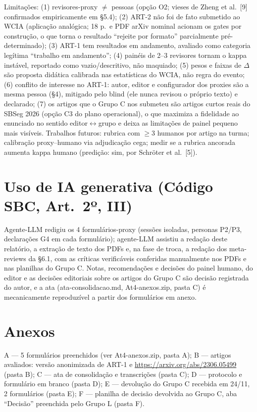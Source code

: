 \documentclass[10pt,a4paper,twocolumn]{article}
\begin{document}
Limitações: (1) revisores-proxy $\neq$ pessoas (opção O2; vieses de Zheng et al.\ [9] confirmados empiricamente em \S5.4); (2) ART-2 não foi de fato submetido ao WCIA (aplicação analógica; 18 p.\ e PDF arXiv nominal acionam os gates por construção, o que torna o resultado ``rejeite por formato'' parcialmente pré-determinado); (3) ART-1 tem resultados em andamento, avaliado como categoria legítima ``trabalho em andamento''; (4) painéis de 2--3 revisores tornam o kappa instável, reportado como vazio/descritivo, não maquiado; (5) pesos e faixas de $\Delta$ são proposta didática calibrada nas estatísticas do WCIA, não regra do evento; (6) conflito de interesse no ART-1: autor, editor e configurador dos proxies são a mesma pessoa (\S4), mitigado pelo blind (ele nunca revisou o próprio texto) e declarado; (7) os artigos que o Grupo C nos submeteu são artigos curtos reais do SBSeg 2026 (opção C3 do plano operacional), o que maximiza a fidelidade ao enunciado no sentido editor$\leftrightarrow$grupo e deixa as limitações de painel pequeno mais visíveis. Trabalhos futuros: rubrica com $\geq$3 humanos por artigo na turma; calibração proxy--humano via adjudicação cega; medir se a rubrica ancorada aumenta kappa humano (predição: sim, por Schröter et al.\ [5]).

\section*{Uso de IA generativa (Código SBC, Art.\ 2º, III)}

Agente-LLM redigiu os 4 formulários-proxy (sessões isoladas, personas P2/P3, declarações G4 em cada formulário); agente-LLM assistiu a redação deste relatório, a extração de texto dos PDFs e, na fase de troca, a redação dos meta-reviews da \S6.1, com as críticas verificáveis conferidas manualmente nos PDFs e nas planilhas do Grupo C. Notas, recomendações e decisões do painel humano, do editor e as decisões editoriais sobre os artigos do Grupo C são decisão registrada do autor, e a ata (ata-consolidacao.md, At4-anexos.zip, pasta C) é mecanicamente reproduzível a partir dos formulários em anexo.

\section*{Anexos}

A --- 5 formulários preenchidos (ver At4-anexos.zip, pasta A); B --- artigos avaliados: versão anonimizada de ART-1 e \url{https://arxiv.org/abs/2306.05499} (pasta B); C --- ata de consolidação e transcrições (pasta C); D --- protocolo e formulário em branco (pasta D); E --- devolução do Grupo C recebida em 24/11, 2 formulários (pasta E); F --- planilha de decisão devolvida ao Grupo C, aba ``Decisão'' preenchida pelo Grupo L (pasta F).
\end{document}
